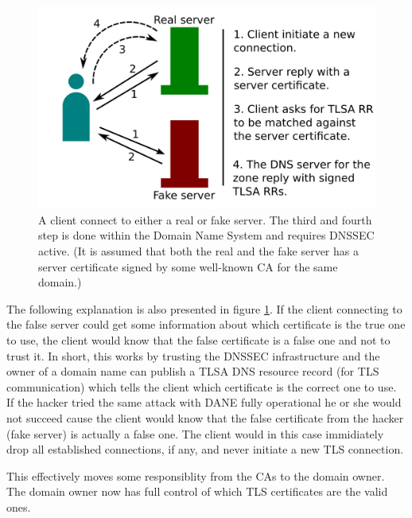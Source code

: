 \begin{figure}[ht]
\begin{center}
\includegraphics[scale=1]{Figures/daneWithTlsa.png}
\end{center}
\caption{A client connect to either a real or fake server. The third and fourth step is done within the Domain Name System and requires DNSSEC active. (It is assumed that both the real and the fake server has a server certificate signed by some well-known CA for the same domain.)\label{ch3:daneWithTlsa}}
\end{figure}

The following explanation is also presented in figure \ref{ch3:daneWithTlsa}.
If the client connecting to the false server could get some information about which certificate is the true one to use, the client would know that the false certificate is a false one and not to trust it.
In short, this works by trusting the DNSSEC infrastructure and the owner of a domain name can publish a TLSA DNS resource record (for TLS communication) which tells the client which certificate is the correct one to use.
If the hacker tried the same attack with DANE fully operational he or she would not succeed cause the client would know that the false certificate from the hacker (fake server) is actually a false one.
The client would in this case immidiately drop all established connections, if any, and never initiate a new TLS connection.

This effectively moves some responsiblity from the CAs to the domain owner.
The domain owner now has full control of which TLS certificates are the valid ones.

